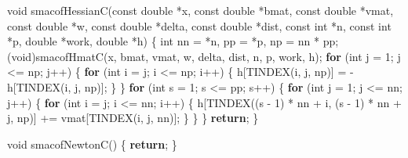 \documentclass[12pt,]{article}
\newenvironment{Shaded}{\begin{snugshade}}{\end{snugshade}}
\newcommand{\DataTypeTok}[1]{\textcolor[rgb]{0.13,0.29,0.53}{#1}}
\newcommand{\DecValTok}[1]{\textcolor[rgb]{0.00,0.00,0.81}{#1}}
\newcommand{\ControlFlowTok}[1]{\textcolor[rgb]{0.13,0.29,0.53}{\textbf{#1}}}
\newcommand{\NormalTok}[1]{#1}
\begin{document}
\begin{Shaded}
\begin{Highlighting}[]
\DataTypeTok{void}\NormalTok{ smacofHessianC(}\DataTypeTok{const} \DataTypeTok{double}\NormalTok{ *x, }\DataTypeTok{const} \DataTypeTok{double}\NormalTok{ *bmat, }\DataTypeTok{const} \DataTypeTok{double}\NormalTok{ *vmat,}
                    \DataTypeTok{const} \DataTypeTok{double}\NormalTok{ *w, }\DataTypeTok{const} \DataTypeTok{double}\NormalTok{ *delta, }\DataTypeTok{const} \DataTypeTok{double}\NormalTok{ *dist,}
                    \DataTypeTok{const} \DataTypeTok{int}\NormalTok{ *n, }\DataTypeTok{const} \DataTypeTok{int}\NormalTok{ *p, }\DataTypeTok{double}\NormalTok{ *work, }\DataTypeTok{double}\NormalTok{ *h) \{}
    \DataTypeTok{int}\NormalTok{ nn = *n, pp = *p, np = nn * pp;}
\NormalTok{    (}\DataTypeTok{void}\NormalTok{)smacofHmatC(x, bmat, vmat, w, delta, dist, n, p, work, h);}
    \ControlFlowTok{for}\NormalTok{ (}\DataTypeTok{int}\NormalTok{ j = }\DecValTok{1}\NormalTok{; j <= np; j++) \{}
        \ControlFlowTok{for}\NormalTok{ (}\DataTypeTok{int}\NormalTok{ i = j; i <= np; i++) \{}
\NormalTok{            h[TINDEX(i, j, np)] = -h[TINDEX(i, j, np)];}
\NormalTok{        \}}
\NormalTok{    \}}
    \ControlFlowTok{for}\NormalTok{ (}\DataTypeTok{int}\NormalTok{ s = }\DecValTok{1}\NormalTok{; s <= pp; s++) \{}
        \ControlFlowTok{for}\NormalTok{ (}\DataTypeTok{int}\NormalTok{ j = }\DecValTok{1}\NormalTok{; j <= nn; j++) \{}
            \ControlFlowTok{for}\NormalTok{ (}\DataTypeTok{int}\NormalTok{ i = j; i <= nn; i++) \{}
\NormalTok{                h[TINDEX((s - }\DecValTok{1}\NormalTok{) * nn + i, (s - }\DecValTok{1}\NormalTok{) * nn + j, np)] +=}
\NormalTok{                    vmat[TINDEX(i, j, nn)];}
\NormalTok{            \}}
\NormalTok{        \}}
\NormalTok{    \}}
    \ControlFlowTok{return}\NormalTok{;}
\NormalTok{\}}

\DataTypeTok{void}\NormalTok{ smacofNewtonC() \{ }\ControlFlowTok{return}\NormalTok{; \}}


\end{Highlighting}
\end{Shaded}
\end{document}
